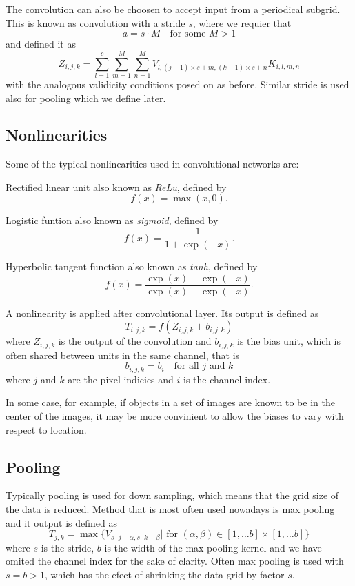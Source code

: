 \documentclass[]{article}
\begin{document}
The convolution can also be choosen to accept input from a periodical subgrid.
This is known as convolution with a stride $s$, where we requier that
\[
a = s \cdot M \quad \text{for some $M > 1$}
\]
and defined it as
\[
Z_{i, j, k} = \sum_{l=1}^c \sum_{m = 1}^M \sum_{n=1}^M
V_{l, (j -1)\times s + m, (k-1)\times s + n} K_{i, l, m, n}
\]
with the analogous validicity conditions posed on as before. Similar stride is used
also for pooling which we define later.

\subsection{Nonlinearities}
Some of the typical nonlinearities used in convolutional networks are:

Rectified linear unit also known as \emph{ReLu}, defined by
\[
f(x) = \max(x, 0).
\]

Logistic funtion also known as \emph{sigmoid}, defined by
\[
f(x) = \frac{1}{1 + \exp(-x)}.
\]

Hyperbolic tangent function also known as \emph{tanh}, defined by
\[
f(x) = \frac{\exp(x) - \exp(-x)}{\exp(x) + \exp(-x)}.
\]

A nonlinearity is applied after convolutional layer. Its output is defined as
\[
T_{i,j,k} = f(Z_{i, j, k} + b_{i,j,k})
\]
where $Z_{i, j, k}$ is the output of the convolution and $b_{i, j, k}$ is the bias
unit, which is often shared between units in the same channel, that is
\[
b_{i, j, k} = b_i \quad \text{for all $j$ and $k$}
\]
where $j$ and $k$ are the pixel indicies and $i$ is the channel index.

In some case, for example, if objects in a set of images are known to be in the
center of the images, it may be more convinient to allow the biases to vary with
respect to location.

\subsection{Pooling}
Typically pooling is used for down sampling, which means that the grid size of
the data is reduced. Method that is most often used nowadays is max pooling and
it output is defined as
\[
T_{j,k} = \max \{V_{s \cdot j + \alpha, s \cdot k + \beta} |
\text{ for $(\alpha, \beta) \in [1,\ldots b] \times  [1,\ldots b]$} \}
\]
where $s$ is the stride, $b$ is the width of the max pooling kernel and we have
omited the channel index for the sake of clarity. Often max pooling is used with
$s = b > 1$, which has the efect of shrinking the data grid by factor $s$.
\end{document}
